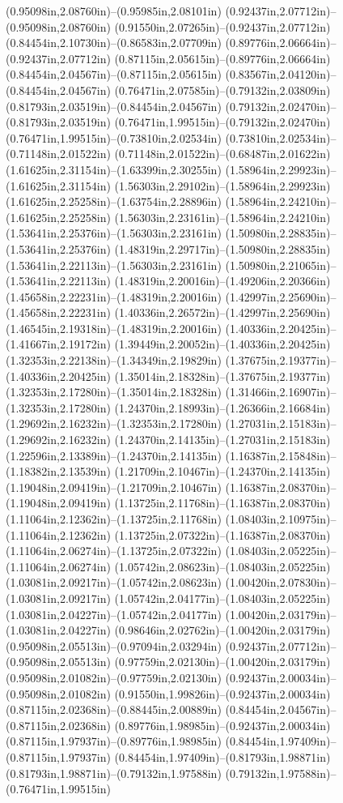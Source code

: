 (0.95098in,2.08760in)--(0.95985in,2.08101in) (0.92437in,2.07712in)--(0.95098in,2.08760in) (0.91550in,2.07265in)--(0.92437in,2.07712in) (0.84454in,2.10730in)--(0.86583in,2.07709in) (0.89776in,2.06664in)--(0.92437in,2.07712in) (0.87115in,2.05615in)--(0.89776in,2.06664in) (0.84454in,2.04567in)--(0.87115in,2.05615in) (0.83567in,2.04120in)--(0.84454in,2.04567in) (0.76471in,2.07585in)--(0.79132in,2.03809in) (0.81793in,2.03519in)--(0.84454in,2.04567in) (0.79132in,2.02470in)--(0.81793in,2.03519in) (0.76471in,1.99515in)--(0.79132in,2.02470in) (0.76471in,1.99515in)--(0.73810in,2.02534in) (0.73810in,2.02534in)--(0.71148in,2.01522in) (0.71148in,2.01522in)--(0.68487in,2.01622in) (1.61625in,2.31154in)--(1.63399in,2.30255in) (1.58964in,2.29923in)--(1.61625in,2.31154in) (1.56303in,2.29102in)--(1.58964in,2.29923in) (1.61625in,2.25258in)--(1.63754in,2.28896in) (1.58964in,2.24210in)--(1.61625in,2.25258in) (1.56303in,2.23161in)--(1.58964in,2.24210in) (1.53641in,2.25376in)--(1.56303in,2.23161in) (1.50980in,2.28835in)--(1.53641in,2.25376in) (1.48319in,2.29717in)--(1.50980in,2.28835in) (1.53641in,2.22113in)--(1.56303in,2.23161in) (1.50980in,2.21065in)--(1.53641in,2.22113in) (1.48319in,2.20016in)--(1.49206in,2.20366in) (1.45658in,2.22231in)--(1.48319in,2.20016in) (1.42997in,2.25690in)--(1.45658in,2.22231in) (1.40336in,2.26572in)--(1.42997in,2.25690in) (1.46545in,2.19318in)--(1.48319in,2.20016in) (1.40336in,2.20425in)--(1.41667in,2.19172in) (1.39449in,2.20052in)--(1.40336in,2.20425in) (1.32353in,2.22138in)--(1.34349in,2.19829in) (1.37675in,2.19377in)--(1.40336in,2.20425in) (1.35014in,2.18328in)--(1.37675in,2.19377in) (1.32353in,2.17280in)--(1.35014in,2.18328in) (1.31466in,2.16907in)--(1.32353in,2.17280in) (1.24370in,2.18993in)--(1.26366in,2.16684in) (1.29692in,2.16232in)--(1.32353in,2.17280in) (1.27031in,2.15183in)--(1.29692in,2.16232in) (1.24370in,2.14135in)--(1.27031in,2.15183in) (1.22596in,2.13389in)--(1.24370in,2.14135in) (1.16387in,2.15848in)--(1.18382in,2.13539in) (1.21709in,2.10467in)--(1.24370in,2.14135in) (1.19048in,2.09419in)--(1.21709in,2.10467in) (1.16387in,2.08370in)--(1.19048in,2.09419in) (1.13725in,2.11768in)--(1.16387in,2.08370in) (1.11064in,2.12362in)--(1.13725in,2.11768in) (1.08403in,2.10975in)--(1.11064in,2.12362in) (1.13725in,2.07322in)--(1.16387in,2.08370in) (1.11064in,2.06274in)--(1.13725in,2.07322in) (1.08403in,2.05225in)--(1.11064in,2.06274in) (1.05742in,2.08623in)--(1.08403in,2.05225in) (1.03081in,2.09217in)--(1.05742in,2.08623in) (1.00420in,2.07830in)--(1.03081in,2.09217in) (1.05742in,2.04177in)--(1.08403in,2.05225in) (1.03081in,2.04227in)--(1.05742in,2.04177in) (1.00420in,2.03179in)--(1.03081in,2.04227in) (0.98646in,2.02762in)--(1.00420in,2.03179in) (0.95098in,2.05513in)--(0.97094in,2.03294in) (0.92437in,2.07712in)--(0.95098in,2.05513in) (0.97759in,2.02130in)--(1.00420in,2.03179in) (0.95098in,2.01082in)--(0.97759in,2.02130in) (0.92437in,2.00034in)--(0.95098in,2.01082in) (0.91550in,1.99826in)--(0.92437in,2.00034in) (0.87115in,2.02368in)--(0.88445in,2.00889in) (0.84454in,2.04567in)--(0.87115in,2.02368in) (0.89776in,1.98985in)--(0.92437in,2.00034in) (0.87115in,1.97937in)--(0.89776in,1.98985in) (0.84454in,1.97409in)--(0.87115in,1.97937in) (0.84454in,1.97409in)--(0.81793in,1.98871in) (0.81793in,1.98871in)--(0.79132in,1.97588in) (0.79132in,1.97588in)--(0.76471in,1.99515in) 
